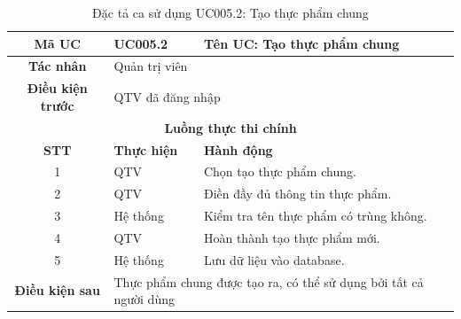\begin{table}[H]
    \centering
    \label{tab:uc005-2}
    \begin{tabularx}{\textwidth}{|c|p{3.5cm}|X|}
        \hline
        \rowcolor{headergreen} 
        \textbf{Mã UC} & \textbf{UC005.2} & \textbf{Tên UC: Tạo thực phẩm chung} \\ \hline
        \textbf{Tác nhân} & \multicolumn{2}{l|}{Quản trị viên} \\ \hline
        \textbf{Điều kiện trước} & \multicolumn{2}{X|}{QTV đã đăng nhập} \\ \hline
        
        \multicolumn{3}{|c|}{\cellcolor{headerorange}\textbf{Luồng thực thi chính}} \\ \hline
        \rowcolor{graybg} \textbf{STT} & \textbf{Thực hiện} & \textbf{Hành động} \\ \hline
        1 & QTV & Chọn tạo thực phẩm chung. \\ \hline
        2 & QTV & Điền đầy đủ thông tin thực phẩm. \\ \hline
        3 & Hệ thống & Kiểm tra tên thực phẩm có trùng không. \\ \hline
        4 & QTV & Hoàn thành tạo thực phẩm mới. \\ \hline
        5 & Hệ thống & Lưu dữ liệu vào database. \\ \hline
        
        \textbf{Điều kiện sau} & \multicolumn{2}{X|}{Thực phẩm chung được tạo ra, có thể sử dụng bởi tất cả người dùng} \\ \hline
    \end{tabularx}
    \caption{Đặc tả ca sử dụng UC005.2: Tạo thực phẩm chung}
\end{table}

